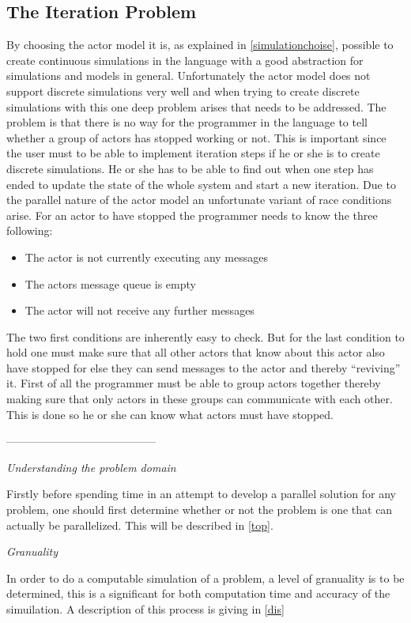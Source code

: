 \subsection{The Iteration Problem}
By choosing the actor model it is, as explained in \cref{simulationchoise}, possible to create continuous simulations in the language with a good abstraction for simulations and models in general. Unfortunately the actor model does not support discrete simulations very well and when trying to create discrete simulations with this one deep problem arises that needs to be addressed.
The problem is that there is no way for the programmer in the language to tell whether a group of actors has stopped working or not. This is important since the user must to be able to implement iteration steps if he or she is to create discrete simulations. He or she has to be able to find out when one step has ended to update the state of the whole system and start a new iteration. Due to the parallel nature of the actor model an unfortunate variant of race conditions arise.
For an actor to have stopped the programmer needs to know the three following:
\begin{itemize}
\item The actor is not currently executing any messages
\item The actors message queue is empty
\item The actor will not receive any further messages
\end{itemize}
The two first conditions are inherently easy to check. But for the last condition to hold one must make sure that all other actors that know about this actor also have stopped for else they can send messages to the actor and thereby \enquote{reviving} it. First of all the programmer must be able to group actors together thereby making sure that only actors in these groups can communicate with each other. This is done so he or she can know what actors must have stopped.

-----------------------------------------

\emph{Understanding the problem domain}

Firstly before spending time in an attempt to develop a parallel solution for any problem, one should first determine whether or not the problem is one that can actually be parallelized. This will be described in \cref{top}.

\emph{Granuality}

In order to do a computable simulation of a problem, a level of granuality is to be determined, this is a significant for both computation time and accuracy of the simuilation. A description of this process is giving in \cref{dis}

